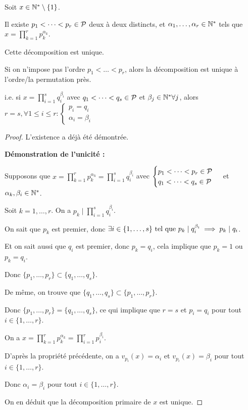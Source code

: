 \documentclass[12pt,a4paper]{report}
\begin{document}
\begin{theorem}

    Soit $x\in \mathbb{N}^*\setminus\{1\}$.

    Il existe $p_1<\dots<p_r \in \mathcal{P}$ deux à deux distincts, et $\alpha_1,\dots,\alpha_r \in \mathbb{N}^*$ tels que $x = \prod_{k=1}^{r} p_k^{\alpha_k}$.

    Cette décomposition est unique.

    Si on n'impose pas l'ordre $p_1 < \dots < p_r$, alors la décomposition est unique à l'ordre/la permutation près.

    i.e. si $x=\prod_{i=1}^s q_i^{\beta_i}$ avec $q_1 < \dots < q_s \in \mathcal{P}$ et $\beta_j \in \mathbb{N}^* \forall j$, alors $r=s, \forall 1 \le i \le r : \begin{cases}
    p_i = q_i\\
    \alpha_i = \beta_i
    \end{cases}$
\end{theorem}

\begin{proof}
    L'existence a déjà été démontrée.

    \textbf{Démonstration de l'unicité :}

    Supposons que $x=\prod_{k=1}^r p_k^{\alpha_k} = \prod_{i=1}^s q_i^{\beta_i}$ avec $\begin{cases}p_1<\dots<p_r \in \mathcal{P}\\q_1<\dots<q_s \in \mathcal{P}\end{cases}$ et $\alpha_k,\beta_i \in \mathbb{N}^*$.

    Soit $k=1,\dots,r$. On a $p_k \mid \prod_{i=1}^s q_i^{\beta_i}$.

    On sait que $p_k$ est premier, donc $\exists i \in \{1,\dots,s\} \text{ tel que } p_k \mid q_i^{\beta_i} \implies p_k \mid q_i$.

    Et on sait aussi que $q_i$ est premier, donc $p_k = q_i$, cela implique que $p_k = 1$ ou $p_k = q_i$.

    Donc $\{p_1,\dots,p_r\}\subset \{q_1,\dots,q_s\}$.

    De même, on trouve que $\{q_1,\dots,q_s\} \subset \{p_1,\dots,p_r\}$.

    Donc $\{p_1,\dots,p_r\} = \{q_1,\dots,q_s\}$, ce qui implique que $r=s$ et $p_i = q_i$ pour tout $i \in \{1,\dots,r\}$.

    On a $x = \prod_{k=1}^r p_k^{\alpha_k} = \prod_{i=1}^r p_i^{\beta_i}$.

    D'après la propriété précédente, on a $v_{p_i}(x) = \alpha_i$ et $v_{p_i}(x) = \beta_i$ pour tout $i \in \{1,\dots,r\}$.

    Donc $\alpha_i = \beta_i$ pour tout $i \in \{1,\dots,r\}$.

    On en déduit que la décomposition primaire de $x$ est unique.
\end{proof}
\end{document}
